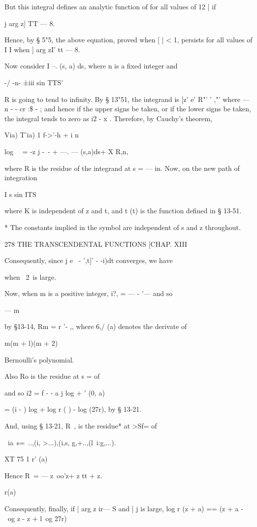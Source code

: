 {{But this integral defines an analytic function of for all values of 12
| if

j arg z] TT — 8.

Hence, by § 5"5, the above equation, proved when [ | < 1, persists for
all values of I I when ] arg zI' tt — 8.

Now consider I --. (s, a) ds, where n is a fixed integer and

-/ -n- ±iii sin TTS'

R is going to tend to infinity. By § 13"51, the integrand is [z' e'
R"' ' ,"' where — n - - cr :\$ - ; and hence if the upper signs be
taken, or if the lower signs be taken, the integral tends to zero as
i2 - x . Therefore, by Cauchy's theorem,

Via) T'ia) 1 f->'-h + i n

log \ \ = -z j -~- + —. — (s,a)ds+ X R,n,

where R is the residue of the integrand at s = — in. Now, on the new
path of integration

I s sin ITS \

where K is independent of z and t, and t (t) is the function defined
in § 13-51.

* The constants implied in the symbol are independent of s and z
throughout.

278 THE TRANSCENDENTAL FUNCTIONS [CHAP. XIII

Consequently, since j e~ - ',t]' - -i)dt converges, we have

when \ 2\ is large.

Now, when m is a positive integer, i?, = — - '— and so

— m

by §13-14, Rm = r '- ,, where 6,/ (a) denotes the derivate of

m(m + l)(m + 2)

Bernoulli's polynomial.

Also Ro is the residue at s = of

and so i2 = f - - a j log + ' (0, a)

= (i - ) log + log r ( ) - log (27r), by § 13-21.

And, using § 13-21, R\ , is the residue* at >Sf= of

\ ia\ s=\ ..,(i, >...),(i,s, g,+..,(l\ i:g,...).

XT 75 1 r' (a)

Hence R\ = — z\ oo'z+ z tt + z.

r(a)

Consequently, finally, if | arg z ir— S and | j is large, log r (z +
a) == (z + a -~ \ og z - z + l\ og 27r)

}}
